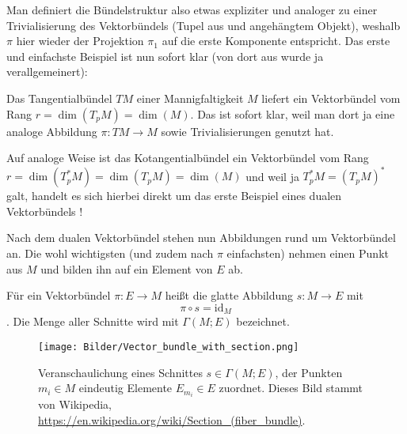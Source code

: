 \documentclass[../H_Analysis_main.tex]{subfiles}
\begin{document}
Man definiert die Bündelstruktur also etwas expliziter und analoger zu einer Trivialisierung des Vektorbündels (Tupel aus und angehängtem Objekt), weshalb $\pi$ hier wieder der Projektion $\pi_1$ auf die erste Komponente entspricht. Das erste und einfachste Beispiel ist nun sofort klar (von dort aus wurde ja verallgemeinert):
\begin{bsp}[Tangentialbündel]
Das Tangentialbündel $TM$ einer Mannigfaltigkeit $M$ liefert ein Vektorbündel vom Rang $r = \dim(T_p M) = \dim(M)$. Das ist sofort klar, weil man dort ja eine analoge Abbildung $\pi: TM \rightarrow M$ sowie Trivialisierungen genutzt hat.%

Auf analoge Weise ist das Kotangentialbündel ein Vektorbündel vom Rang $r = \dim(T_p^*M) = \dim(T_p M) = \dim(M)$ und weil ja $T_p^*M = (T_pM)^*$ galt, handelt es sich hierbei direkt um das erste Beispiel eines dualen Vektorbündels !
\end{bsp}


Nach dem dualen Vektorbündel stehen nun Abbildungen rund um Vektorbündel an. Die wohl wichtigsten (und zudem nach $\pi$ einfachsten) nehmen einen Punkt aus $M$ und bilden ihn auf ein Element von $E$ ab.

\begin{defi}[Schnitt]
Für ein Vektorbündel $\pi: E \rightarrow M$ heißt die glatte Abbildung $s: M \rightarrow E$ mit
\begin{equation}
\pi \circ s = \text{id}_M
\end{equation}
. Die Menge aller Schnitte wird mit $\Gamma(M; E)$ bezeichnet.%
\end{defi}


\begin{figure}
\centering

\texttt{[image: Bilder/Vector\_bundle\_with\_section.png]}

\caption[Veranschaulichung eines Schnittes]{Veranschaulichung eines Schnittes $s \in \Gamma(M; E)$, der Punkten $m_i \in M$ eindeutig Elemente $E_{m_i} \in E$ zuordnet. Dieses Bild stammt von Wikipedia, \url{https://en.wikipedia.org/wiki/Section_(fiber_bundle)}.}
\end{figure}
\end{document}
